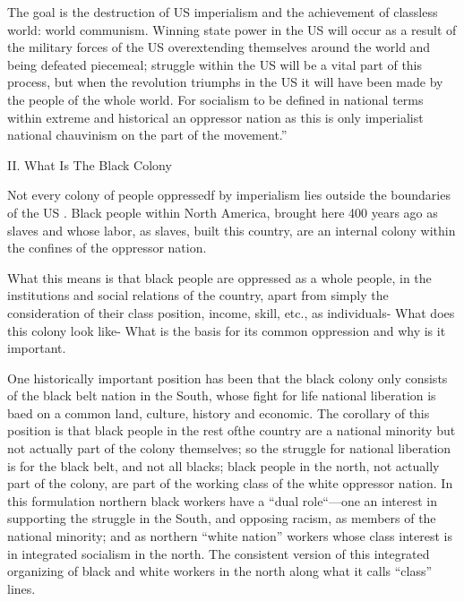 \documentclass[12pt, titlepage]{article}
\begin{document}
{\begin{spacing}{1.10}
The goal is the destruction of US imperialism and the achievement of classless world: world communism. Winning state power in the US will occur as a result of the military forces of the US overextending themselves around the world and being defeated piecemeal; struggle within the US will be a vital part of this process, but when the revolution triumphs in the US it will have been made by the people of the whole world. For socialism to be defined in national terms within extreme and historical an oppressor nation as this is only imperialist national chauvinism on the part of the movement.''

\pagebreak
\begin{center}
II. What Is The Black Colony
\end{center}

Not every colony of people oppressedƒ by imperialism lies outside the boundaries of the US . Black people within North America, brought here 400 years ago as slaves and whose labor, as slaves, built this country, are an internal colony within the confines of the oppressor nation.

What this means is that black people are oppressed as a whole people, in the institutions and social relations of the country, apart from simply the consideration of their class position, income, skill, etc., as individuals- What does this colony look like- What is the basis for its common oppression and why is it important.

One historically important position has been that the black colony only consists of the black belt nation in the South, whose fight for life national liberation is baed on a common land, culture, history and economic. The corollary of this position is that black people in the rest ofthe country are a national minority but not actually part of the colony themselves; so the struggle for national liberation is for the black belt, and not all blacks; black people in the north, not actually part of the colony, are part of the working class of the white oppressor nation. In this formulation northern black workers have a ``dual role``—one an interest in supporting the struggle in the South, and opposing racism, as members of the national minority; and as northern ``white nation'' workers whose class interest is in integrated socialism in the north. The consistent version of this integrated organizing of black and white workers in the north along what it calls ``class'' lines.


\end{spacing}}
\end{document}
